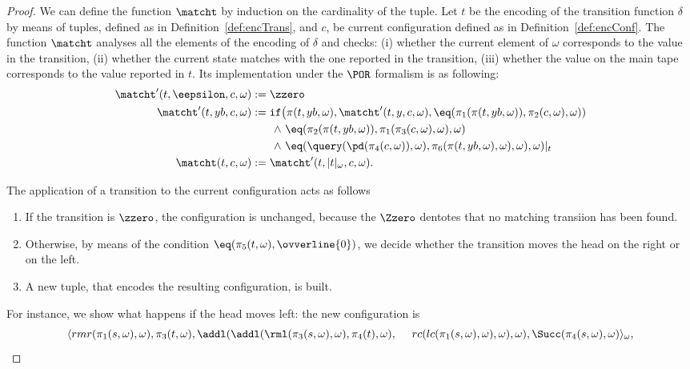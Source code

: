 \begin{proof}
We can define the function $\matcht$
by induction on the cardinality of the tuple.
{Let $t$ be
the encoding of the transition
function $\delta$ by means of tuples,
defined as in Definition~\ref{def:encTrans},
and $c$, be current configuration
defined as in Definition~\ref{def:encConf}.}
The function $\matcht$ analyses
all the elements of the encoding of $\delta$
and checks:
(i) whether the current element of $\omega$
corresponds to the value in the
transition,
(ii) whether the current state matches with the
one reported in the transition,
(iii) whether the value on the main tape
corresponds to the value reported in $t$.
Its implementation under the $\POR$
formalism is as following:
\begin{align*}
\matcht'(t,\eepsilon,c,\omega) &:= \zzero \\
%
\matcht'(t,yb,c,\omega) &:= \mathtt{if}\big(
\pi(t,yb,\omega), \matcht' (t,y,c,\omega),
\eq(\pi_1(\pi(t,yb,\omega)),
\pi_2(c,\omega),\omega)) \\
%
& \ \ \ \ \ \ {\wedge} \
\eq(\pi_2(\pi(t,yb,\omega)),\pi_1(\pi_3(c,\omega),
\omega),\omega) \\
%
& \ \ \ \ \ \
{\wedge}  \
\eq(\query(\pd(\pi_4(c,\omega)),\omega),
\pi_6(\pi(t,yb,\omega),\omega),
\omega),\omega)|_t \\
%
\matcht(t,c,\omega) &:= {\matcht'}(t,
|t|_\omega,c,\omega).
\end{align*}


The application of a transition
to the current configuration acts as follows
\begin{enumerate}
\itemsep0em
\item If the transition is $\zzero$,
the configuration is unchanged, because the $\Zzero$ dentotes that no matching transiion has been found.

\item Otherwise, by means of the
condition
{$\eq(\pi_5(t,\omega),\ovverline{0})$}, we decide whether
the transition moves the head on the right or on the left.

\item {A new tuple, that encodes
the resulting configuration, is built.}
\end{enumerate}

For instance, we show what happens if the
head moves left: the new configuration is
\[
\langle rmr(
\pi_1(s,\omega),\omega),
\pi_3(t,\omega), \addl(
\addl(\rml(\pi_3(s,\omega), \omega), \pi_4(t),
\omega), \\ \ \ \ \ rc(lc(\pi_1(s,\omega),\omega),
\omega),\omega),
{\Succ}(\pi_4(s,\omega),\omega)
\rangle_\omega,
\]


\end{proof}
